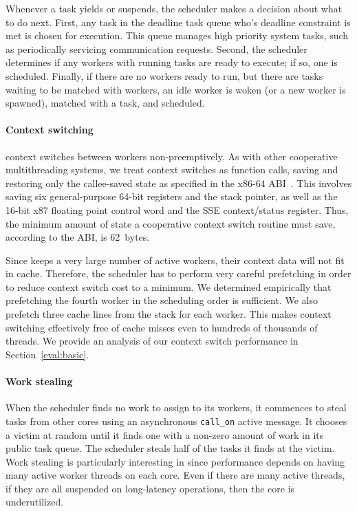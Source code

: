 Whenever a task yields or suspends, the scheduler makes a decision about what
to do next. First, any task in the deadline task queue who's deadline
constraint is met is chosen for execution. This queue manages high priority
system tasks, such as periodically servicing communication requests. Second,
the scheduler determines if any workers with running tasks are ready to
execute; if so, one is scheduled. Finally, if there are no workers ready to
run, but there are tasks waiting to be matched with workers, an idle worker is
woken (or a new worker is spawned), matched with a task, and scheduled.

\paragraph{Context switching} 
\Grappa context switches between workers non-preemptively. As with other
cooperative multithreading systems, we treat context switches as function
calls, saving and restoring only the callee-saved state as specified in the
x86-64 ABI~\cite{amd64:abi:2012}. This involves saving six general-purpose
64-bit registers and the stack pointer, as well as the 16-bit x87 floating
point control word and the SSE context/status register. Thus, the minimum
amount of state a cooperative context switch routine must save, according to
the ABI, is 62~bytes.

Since \Grappa keeps a very large number of active workers, their context data
will not fit in cache. Therefore, the scheduler has to perform very careful
prefetching in order to reduce context switch cost to a minimum. We determined
empirically that prefetching the fourth worker in the scheduling order is
sufficient. We also prefetch three cache lines from the stack for each worker.
This makes context switching effectively free of cache misses even to hundreds
of thousands of threads. We provide an analysis of our context switch
performance in Section~\ref{eval:basic}.

\paragraph{Work stealing} 
When the scheduler finds no work to assign to its workers, it commences to
steal tasks from other cores using an asynchronous \texttt{call\_on} active
message. It chooses a victim at random until it finds one with a non-zero
amount of work in its public task queue. The scheduler steals half of the
tasks it finds at the victim. Work stealing is particularly interesting in
\Grappa since performance depends on having many active worker threads on each
core. Even if there are many active threads, if they are all suspended on
long-latency operations, then the core is underutilized.

